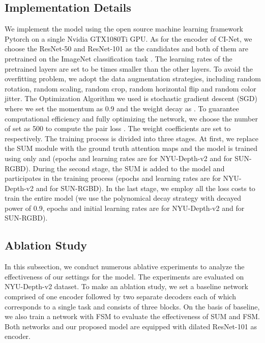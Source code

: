 \documentclass[sn-mathphys]{sn-jnl}
\theoremstyle{thmstyleone}\newtheorem{theorem}{Theorem}\newtheorem{proposition}[theorem]{Proposition}
\theoremstyle{thmstyletwo}\newtheorem{example}{Example}\newtheorem{remark}{Remark}
\theoremstyle{thmstylethree}\newtheorem{definition}{Definition}\usepackage[numbers,sort&compress]{natbib}
\begin{document}
\subsection{Implementation Details}
We implement the model using the open source machine learning framework Pytorch on a single Nvidia GTX1080Ti GPU. As for the encoder of CI-Net, we choose the ResNet-50 and ResNet-101 as the candidates and both of them are pretrained on the ImageNet classification task \cite{saxena2007learning}. The learning rates of the pretrained layers are set to be  times smaller than the other layers. To avoid the overfitting problem, we adopt the data augmentation strategies, including random rotation, random scaling, random crop, random horizontal flip and random color jitter. The Optimization Algorithm we used is stochastic gradient descent (SGD) \cite{Bottou_2010} where we set the momentum as 0.9 and the weight decay as . To guarantee computational efficiency and fully optimizing the network, we choose the number of set  as 500 to compute the pair loss . The weight coefficients  are set to  respectively. The training process is divided into three stages. At first, we replace the SUM module with the ground truth attention maps and the model is trained using only  and  (epochs and learning rates are  for NYU-Depth-v2 and  for SUN-RGBD). During the second stage, the SUM is added to the model and  participates in the training process (epochs and learning rates are  for NYU-Depth-v2 and  for SUN-RGBD). In the last stage, we employ all the loss costs to train the entire model (we use the polynomical decay strategy with decayed power of 0.9, epochs and initial learning rates are  for NYU-Depth-v2 and  for SUN-RGBD).



\subsection{Ablation Study}
In this subsection, we conduct numerous ablative experiments to analyze the effectiveness of our settings for the model. The experiments are evaluated on NYU-Depth-v2 dataset. To make an ablation study, we set a baseline network comprised of one encoder followed by two separate decoders each of which corresponds to a single task and consists of three blocks. On the basis of baseline, we also train a network with FSM to evaluate the effectiveness of SUM and FSM. Both networks and our proposed model are equipped with dilated ResNet-101 as encoder. 
\end{document}
